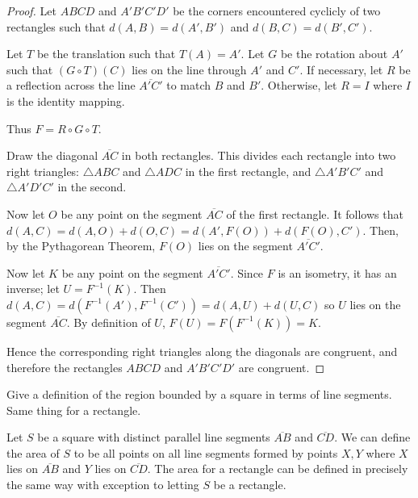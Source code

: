 \begin{proof}
    Let $ABCD$ and $A'B'C'D'$ be the corners encountered cyclicly of two rectangles such that 
        $d(A,B) = d(A',B')$ and $d(B,C) = d(B',C')$.

    Let $T$ be the translation such that $T(A) = A'$.
    Let $G$ be the rotation about $A'$ such that $(G \circ T)(C)$ lies on the line through $A'$ and $C'$.
    If necessary, let $R$ be a reflection across the line $\overline{A'C'}$ to match $B$ and $B'$.
    Otherwise, let $R = I$ where $I$ is the identity mapping.
    
    Thus $F = R \circ G \circ T$.

    Draw the diagonal $\overline{AC}$ in both rectangles. 
    This divides each rectangle into two right triangles: 
        $\triangle ABC$ and $\triangle ADC$ in the first rectangle, 
        and $\triangle A'B'C'$ and $\triangle A'D'C'$ in the second.

    Now let $O$ be any point on the segment $\overline{AC}$ of the first rectangle.
    It follows that $d(A,C) = d(A,O) + d(O,C) = d(A',F(O)) + d(F(O),C')$. 
    Then, by the Pythagorean Theorem, $F(O)$ lies on the segment $\overline{A'C'}$.

    Now let $K$ be any point on the segment $\overline{A'C'}$.  
    Since $F$ is an isometry, it has an inverse; let $U = F^{-1}(K)$.  
    Then $d(A,C) = d(F^{-1}(A'), F^{-1}(C')) = d(A,U) + d(U,C)$
        so $U$ lies on the segment $\overline{AC}$.  
    By definition of $U$, $F(U) = F(F^{-1}(K)) = K$.

    Hence the corresponding right triangles along the diagonals are congruent, 
        and therefore the rectangles $ABCD$ and $A'B'C'D'$ are congruent.
\end{proof}

\begin{tcolorbox}[title=Problem 9, breakable]
    Give a definition of the region bounded by a square in terms of line 
        segments. Same thing for a rectangle.
\end{tcolorbox}

\begin{definition}
    Let $S$ be a square with distinct parallel line segments $\overline{AB}$ and $\overline{CD}$.
    We can define the area of $S$ to be all points on all line segments formed by 
        points $X, Y$ where $X$ lies on $\overline{AB}$ and $Y$ lies on $\overline{CD}$.
    The area for a rectangle can be defined in precisely the same way
        with exception to letting $S$ be a rectangle.
\end{definition}

